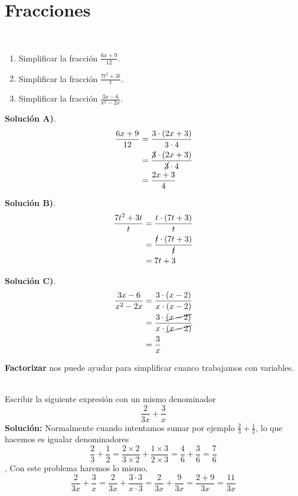 \newpage


\section{Fracciones}\label{section:fracciones}
\begin{ejemplo}{\ \\}
	\begin{enumerate}[label=\Alph*)]
		\item Simplificar la fracción $\frac{6x+9}{12}$.
		\item Simplificar la fracción $\frac{7t^2+3t}{t}$.
		\item Simplificar la fracción $\frac{3x-6}{x^2-2x}$.		
	\end{enumerate}
	\textbf{Solución A)}. 
	\begin{align*}
	\frac{6x+9}{12} &= \frac{3\cdot (2x+3)}{3\cdot 4} \\
	&= \frac{\cancel{3}\cdot (2x+3)}{\cancel{3}\cdot 4} \\
	&= \frac{2x+3}{4}
	\end{align*}
	
	\textbf{Solución B)}. 
	\begin{align*}
	\frac{7t^2+3t}{t} &= \frac{t\cdot (7t+3)}{t} \\
	&= \frac{\cancel{t}\cdot (7t+3) }{\cancel{t}} \\
	&= 7t+3
	\end{align*}
	
	\textbf{Solución C)}. 
	\begin{align*}
	\frac{3x-6}{x^2-2x} &= \frac{3\cdot (x-2)}{x\cdot (x-2)} \\
	&=  \frac{3\cdot \cancel{(x-2)}}{x\cdot \cancel{(x-2)}}\\
	&= \frac{3}{x}
	\end{align*}
	
\end{ejemplo}

\begin{tcolorbox}[colback=red!5!white,colframe=red!75!black]
	\textbf{Factorizar} nos puede ayudar para simplificar cuanco trabajamos con variables.
\end{tcolorbox}

\begin{ejemplo}{\ \\}
	Escribir la siguiente expresión con un mismo denominador
	\[\frac{2}{3x} + \frac{3}{x}\]
	\textbf{Solución: }Normalmente cuando intentamos sumar por ejemplo $\frac{2}{3} + \frac{1}{2}$, lo que hacemos es igualar denominadores 
	\[\frac{2}{3} + \frac{1}{2} = \frac{2\times2}{3\times2} + \frac{1\times3}{2\times3} = \frac{4}{6} + \frac{3}{6} = \frac{7}{6}\],
	Con este problema haremos lo mismo,
	\[\frac{2}{3x} + \frac{3}{x} = \frac{2}{3x} + \frac{3\cdot 3}{x\cdot 3} = \frac{2}{3x}  + \frac{9}{3x} = \frac{2+9}{3x} = \frac{11}{3x} \]
\end{ejemplo}

